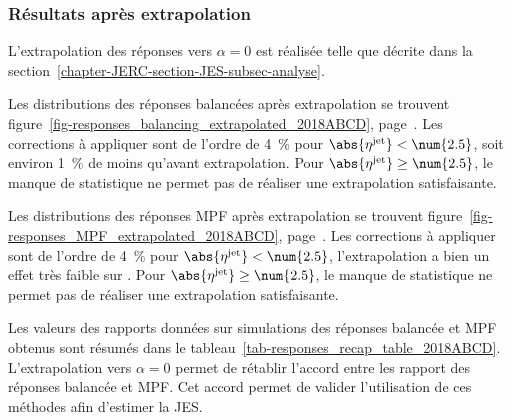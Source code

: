\subsubsection{Résultats après extrapolation}\label{chapter-JERC-section-JES-subsec-results-subsubsec-after_extrap}
L'extrapolation des réponses vers $\alpha=0$ est réalisée telle que décrite dans la section~\ref{chapter-JERC-section-JES-subsec-analyse}.
\par Les distributions des réponses balancées après extrapolation se trouvent figure~\ref{fig-responses_balancing_extrapolated_2018ABCD}, page~\pageref{fig-responses_balancing_extrapolated_2018ABCD}.
Les corrections à appliquer sont de l'ordre de \SI{4}{\%} pour $\abs{\eta^\text{jet}} < \num{2.5}$, soit environ \SI{1}{\%} de moins qu'avant extrapolation.
Pour $\abs{\eta^\text{jet}}\geq\num{2.5}$, le manque de statistique ne permet pas de réaliser une extrapolation satisfaisante.
\par Les distributions des réponses MPF après extrapolation se trouvent figure~\ref{fig-responses_MPF_extrapolated_2018ABCD}, page~\pageref{fig-responses_MPF_extrapolated_2018ABCD}.
Les corrections à appliquer sont de l'ordre de \SI{4}{\%} pour $\abs{\eta^\text{jet}} < \num{2.5}$, l'extrapolation a bien un effet très faible sur \RMPF.
Pour $\abs{\eta^\text{jet}}\geq\num{2.5}$, le manque de statistique ne permet pas de réaliser une extrapolation satisfaisante.
\par Les valeurs des rapports données sur simulations des réponses balancée et MPF obtenus sont résumés dans le tableau~\ref{tab-responses_recap_table_2018ABCD}.
L'extrapolation vers $\alpha=0$ permet de rétablir l'accord entre les rapport des réponses balancée et MPF.
Cet accord permet de valider l'utilisation de ces méthodes afin d'estimer la JES.







\clearpage

